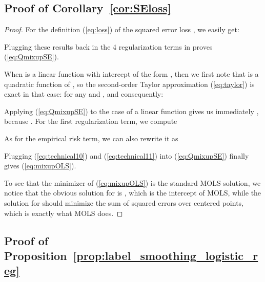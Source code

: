 \documentclass[twoside,11pt]{article}
\begin{document}
\subsection{Proof of Corollary~\ref{cor:SEloss}}

\begin{proof}
For the definition (\ref{eq:loss}) of the squared error loss , we easily get:

Plugging these results back in the 4 regularization terms in  proves (\ref{eq:QmixupSE}).

When  is a linear function with intercept of the form , then we first note that  is a quadratic function of , so the second-order Taylor approximation (\ref{eq:taylor}) is exact in that case:
 for any  and , and consequently:


Applying (\ref{eq:QmixupSE}) to the case of a linear function  gives us immediately , because . For the first regularization term, we compute

As for the empirical risk term, we can also rewrite it as

Plugging (\ref{eq:technical10}) and (\ref{eq:technical11}) into (\ref{eq:QmixupSE}) finally gives (\ref{eq:mixupOLS}).

To see that the minimizer of (\ref{eq:mixupOLS}) is the standard MOLS solution, we notice that the obvious solution for  is , which is the intercept of MOLS, while the solution for  should minimize the sum of squared errors over centered points, which is exactly what MOLS does.
\end{proof}

\subsection{Proof of Proposition~\ref{prop:label_smoothing_logistic_reg}}
\end{document}
